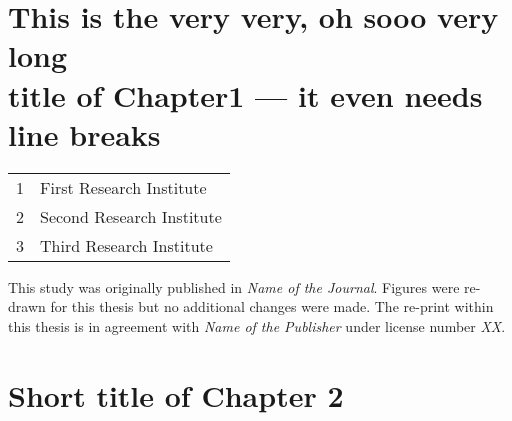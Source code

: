 
\chapter[This is the very very, oh sooo very long title of Chapter 1 --- it even needs line breaks]{\centering This is the very very, oh sooo very long\\ title of Chapter1 --- it even needs line breaks}
\vfill


\noindent\begin{tabular}{L{.015\textwidth}L{.985\textwidth}}
    1 & First Research Institute \\
    2 & Second Research Institute \\
    3 & Third Research Institute
\end{tabular}

\noindent\colorbox{clrt1!15}{\parbox{\textwidth}{
This study was originally published in \textit{Name of the Journal}.
Figures were re-drawn for this thesis but no additional changes were made.
The re-print within this thesis is in agreement with \textit{Name of the Publisher} under license number \textit{XX}.

}}

\noindent

\chapter[Short title of Chapter 2]{\centering Short title of Chapter 2\\}

\vspace{.25\paperheight}


